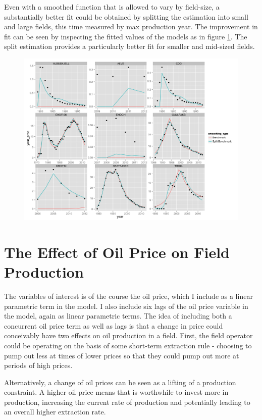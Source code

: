 \documentclass[12pt]{scrartcl} %
\begin{document}
Even with a smoothed function that is allowed to vary by field-size, a substantially better fit could be obtained by splitting the estimation into small and large fields, this time measured by max production year.  The improvement in fit can be seen by inspecting the fitted values of the models as in figure \ref{bench_vs_split}. The split estimation provides a particularly better fit for smaller and mid-sized fields.

\begin{figure}
	\includegraphics[width=.8\textwidth]{bench_vs_split.png}
	\caption{}
	\label{bench_vs_split}
\end{figure}

\section{The Effect of Oil Price on Field Production}

The variables of interest is of the course the oil price, which I include as a linear parametric term in the model.  I also include six lags of the oil price variable in the model, again as linear parametric terms.  The idea of including both a concurrent oil price term as well as lags is that a change in price could conceivably have two effects on oil production in a field.  First, the field operator could be operating on the basis of some short-term extraction rule - choosing to pump out less at times of lower prices so that they could pump out more at periods of high prices.  

Alternatively, a change of oil prices can be seen as a lifting of a production constraint.  A higher oil price means that is worthwhile to invest more in production, increasing the current rate of production and potentially leading to an overall higher extraction rate.  
\end{document}
